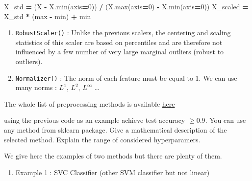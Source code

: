 \documentclass[10pt,a4paper]{article}
\newenvironment{Shaded}{\begin{snugshade}}{\end{snugshade}}
\newcommand{\BuiltInTok}[1]{#1}
\newcommand{\DecValTok}[1]{\textcolor[rgb]{0.00,0.00,0.81}{#1}}
\newcommand{\NormalTok}[1]{#1}
\newcommand{\OperatorTok}[1]{\textcolor[rgb]{0.81,0.36,0.00}{\textbf{#1}}}
\providecommand{\tightlist}{%
  \setlength{\parskip}{0pt}
  }
\theoremstyle{break}
\begin{document}
\begin{Shaded}
\begin{Highlighting}[]
\NormalTok{X_std }\OperatorTok{=}\NormalTok{ (X }\OperatorTok{-}\NormalTok{ X.}\BuiltInTok{min}\NormalTok{(axis}\OperatorTok{=}\DecValTok{0}\NormalTok{)) }\OperatorTok{/}\NormalTok{ (X.}\BuiltInTok{max}\NormalTok{(axis}\OperatorTok{=}\DecValTok{0}\NormalTok{) }\OperatorTok{-}\NormalTok{ X.}\BuiltInTok{min}\NormalTok{(axis}\OperatorTok{=}\DecValTok{0}\NormalTok{))}
\NormalTok{X_scaled }\OperatorTok{=}\NormalTok{ X_std }\OperatorTok{*}\NormalTok{ (}\BuiltInTok{max} \OperatorTok{-} \BuiltInTok{min}\NormalTok{) }\OperatorTok{+} \BuiltInTok{min}
\end{Highlighting}
\end{Shaded}

\begin{enumerate}
\def\labelenumi{\arabic{enumi}.}
\setcounter{enumi}{1}
\tightlist
\item
  \texttt{RobustScaler()} : Unlike the previous scalers, the centering and scaling statistics of this scaler are based on percentiles and are therefore not influenced by a few number of very large marginal outliers (robust to outliers).
\item
  \texttt{Normalizer()} : The norm of each feature must be equal to 1. We can use many norms : \(L^1\), \(L^2\), \(L^\infty\) \ldots{}
\end{enumerate}

The whole list of preprocessing methods is available \href{https://scikit-learn.org/stable/modules/classes.html\#module-sklearn.preprocessing}{here}

\begin{tcolorbox}

using the previous code as an example achieve test accuracy \(\geq 0.9\). You can use any method from sklearn package. Give a mathematical description of the selected method. Explain the range of considered hyperparamers.

\end{tcolorbox}

We give here the examples of two methods but there are plenty of them.

\begin{enumerate}
\def\labelenumi{\arabic{enumi}.}
\tightlist
\item
  Example 1 : SVC Classifier (other SVM classifier but not linear)
\end{enumerate}
\end{document}

